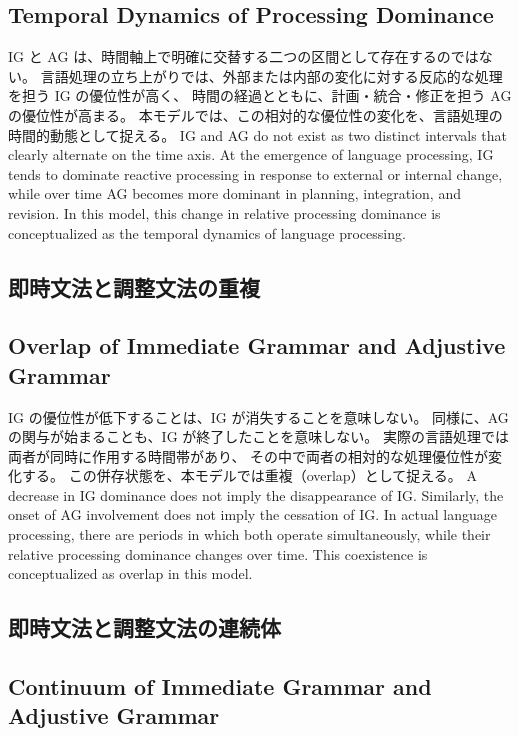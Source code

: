 \documentclass[a4paper]{article}
\begin{document}
  \subsection{Temporal Dynamics of Processing Dominance}
\fi

\ifJPN
IG と AG は、時間軸上で明確に交替する二つの区間として存在するのではない。
言語処理の立ち上がりでは、外部または内部の変化に対する反応的な処理を担う IG の優位性が高く、
時間の経過とともに、計画・統合・修正を担う AG の優位性が高まる。
本モデルでは、この相対的な優位性の変化を、言語処理の時間的動態として捉える。
\else
IG and AG do not exist as two distinct intervals that clearly alternate on the time axis.
At the emergence of language processing, IG tends to dominate reactive processing in response to external or internal change,
while over time AG becomes more dominant in planning, integration, and revision.
In this model, this change in relative processing dominance is conceptualized as the temporal dynamics of language processing.
\fi

\ifJPN
  \subsection{即時文法と調整文法の重複}
\else
  \subsection{Overlap of Immediate Grammar and Adjustive Grammar}
\fi

\ifJPN
IG の優位性が低下することは、IG が消失することを意味しない。
同様に、AG の関与が始まることも、IG が終了したことを意味しない。
実際の言語処理では両者が同時に作用する時間帯があり、
その中で両者の相対的な処理優位性が変化する。
この併存状態を、本モデルでは重複（overlap）として捉える。
\else
A decrease in IG dominance does not imply the disappearance of IG.
Similarly, the onset of AG involvement does not imply the cessation of IG.
In actual language processing, there are periods in which both operate simultaneously,
while their relative processing dominance changes over time.
This coexistence is conceptualized as overlap in this model.
\fi

\ifJPN
  \subsection{即時文法と調整文法の連続体}
\else
  \subsection{Continuum of Immediate Grammar and Adjustive Grammar}
\fi
\end{document}
